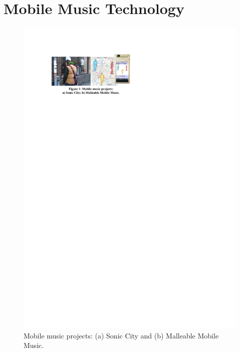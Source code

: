 \section{Mobile Music Technology}

\begin{figure}[t]
\centering
\includegraphics[width=\textwidth]{img1.pdf}
\caption{Mobile music projects: (a) Sonic City and (b) Malleable Mobile Music.}
\label{Gaye:fig:1} 
\end{figure}

